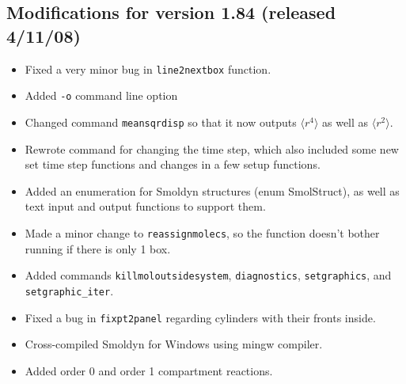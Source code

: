 \documentclass {scrbook}
\newcommand {\ttt} {\texttt}
\begin{document}
\subsection{Modifications for version 1.84 (released 4/11/08)}
\begin{itemize}
\item Fixed a very minor bug in \ttt{line2nextbox} function.
\item Added \ttt{-o} command line option
\item Changed command \ttt{meansqrdisp} so that it now outputs $\langle r^4\rangle$ as well as $\langle r^2\rangle$.
\item Rewrote command for changing the time step, which also included some new set time step functions and changes in a few setup functions.
\item Added an enumeration for Smoldyn structures (enum SmolStruct), as well as text input and output functions to support them.
\item Made a minor change to \ttt{reassignmolecs}, so the function doesn't bother running if there is only 1 box.
\item Added commands \ttt{killmoloutsidesystem}, \ttt{diagnostics}, \ttt{setgraphics}, and \ttt{setgraphic\_iter}.
\item Fixed a bug in \ttt{fixpt2panel} regarding cylinders with their fronts inside.
\item Cross-compiled Smoldyn for Windows using mingw compiler.
\item Added order 0 and order 1 compartment reactions.
\end{itemize}
\end{document}
